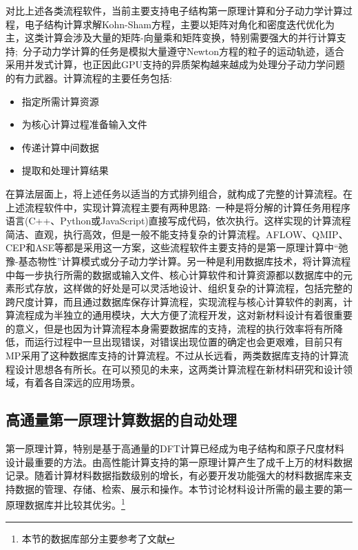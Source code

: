 对比上述各类流程软件，当前主要支持电子结构第一原理计算和分子动力学计算过程，电子结构计算求解\textrm{Kohn-Sham}方程，主要以矩阵对角化和密度迭代优化为主，这类计算会涉及大量的矩阵-向量乘和矩阵变换，特别需要强大的并行计算支持;~分子动力学计算的任务是模拟大量遵守\textrm{Newton}方程的粒子的运动轨迹，适合采用并发式计算，也正因此\textrm{GPU}支持的异质架构越来越成为处理分子动力学问题的有力武器。计算流程的主要任务包括:
\begin{itemize}
	\item 指定所需计算资源
	\item 为核心计算过程准备输入文件
	\item 传递计算中间数据
	\item 提取和处理计算结果
\end{itemize}
在算法层面上，将上述任务以适当的方式排列组合，就构成了完整的计算流程。在上述流程软件中，实现计算流程主要有两种思路:~一种是将分解的计算任务用程序语言(\textrm{C++}、\textrm{Python}或\textrm{JavaScript})直接写成代码，依次执行。这样实现的计算流程简洁、直观，执行高效，但是一般不能支持复杂的计算流程。\textrm{AFLOW}、\textrm{QMIP}、\textrm{CEP}和\textrm{ASE}等都是采用这一方案，这些流程软件主要支持的是第一原理计算中“弛豫-基态物性”计算模式或分子动力学计算。另一种是利用数据库技术，将计算流程中每一步执行所需的数据或输入文件、核心计算软件和计算资源都以数据库中的元素形式存放，这样做的好处是可以灵活地设计、组织复杂的计算流程，包括完整的跨尺度计算，而且通过数据库保存计算流程，实现流程与核心计算软件的剥离，计算流程成为半独立的通用模块，大大方便了流程开发，这对新材料设计有着很重要的意义，但是也因为计算流程本身需要数据库的支持，流程的执行效率将有所降低，而运行过程中一旦出现错误，对错误出现位置的确定也会更艰难，目前只有\textrm{MP}采用了这种数据库支持的计算流程。不过从长远看，两类数据库支持的计算流程设计思想各有所长。在可以预见的未来，这两类计算流程在新材料研究和设计领域，有着各自深远的应用场景。

\subsection{高通量第一原理计算数据的自动处理}\label{chap:database} 
第一原理计算，特别是基于高通量的\textrm{DFT}计算已经成为电子结构和原子尺度材料设计最重要的方法。由高性能计算支持的第一原理计算产生了成千上万的材料数据记录。随着计算材料数据指数级别的增长，有必要开发功能强大的材料数据库来支持数据的管理、存储、检索、展示和操作。本节讨论材料设计所需的最主要的第一原理数据库并比较其优劣。\footnote{本节的数据库部分主要参考了文献}

